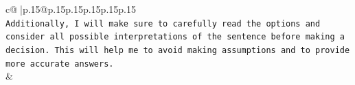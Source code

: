 \documentclass{article}
\begin{document}
{\begin{supertabular}{c@{$\;$}|p{.15\linewidth}@{}p{.15\linewidth}p{.15\linewidth}p{.15\linewidth}p{.15\linewidth}p{.15\linewidth}}
{{{\\ 
\texttt{Additionally, I will make sure to carefully read the options and consider all possible interpretations of the sentence before making a decision. This will help me to avoid making assumptions and to provide more accurate answers.} \\
            }
        }
    }
    & \\ \\

\end{supertabular}
}
\end{document}
